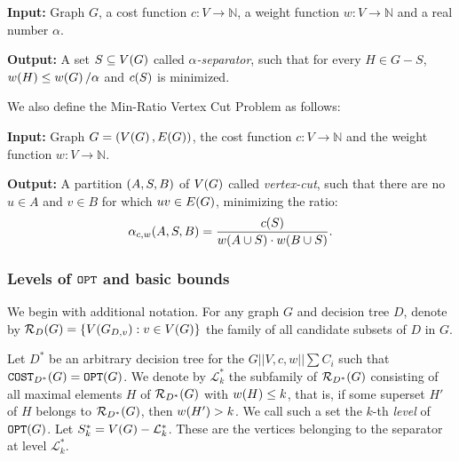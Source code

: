 \begin{tcolorbox}[colback=white, title=Weighted $\alpha$-Separator Problem, fonttitle=\bfseries, breakable]
\textbf{Input:} Graph $G$, a cost function $c:V\to \mathbb{N}$, a weight function $w:V\to \mathbb{N}$ and a real number $\alpha$.

\textbf{Output:} A set $S\subseteq V\mathopen{}\left( G \right)$ called \textit{$\alpha$-separator}, such that for every $H\in G-S$, $w\mathopen{}\left( H \right)\leq w\mathopen{}\left( G \right)/\alpha$ and $c\mathopen{}\left( S \right)$ is minimized.
\end{tcolorbox}
We also define the Min-Ratio Vertex Cut Problem as follows:

\begin{tcolorbox}[colback=white, title= Min-Ratio Vertex Cut Problem, fonttitle=\bfseries, breakable]
\textbf{Input:} Graph $G=\mathopen{}\left( V\mathopen{}\left( G \right), E\mathopen{}\left( G \right) \right)$, the cost function $c:V\to \mathbb{N}$ and the weight function $w:V\to \mathbb{N}$.

\textbf{Output:} A partition $\mathopen{}\left( A,S,B \right)$ of $V\mathopen{}\left( G \right)$ called \textit{vertex-cut}, such that there are no $u\in A$ and $v\in B$ for which $uv\in E\mathopen{}\left( G \right)$, minimizing the ratio:
$$
\alpha_{c,w}\mathopen{}\left( A,S,B \right)=\frac{c\mathopen{}\left( S \right)}{w\mathopen{}\left( A\cup S \right)\cdot w\mathopen{}\left( B\cup S \right)}.
$$
\end{tcolorbox}
\subsubsection{Levels of $\texttt{OPT}$ and basic bounds}\label{levelsOfOptAndBasicBounds}

We begin with additional notation. 
For any graph $G$ and decision tree $D$, denote by 
$\mathcal{R}_D\mathopen{}\left( G \right) = \mathopen{}\left\{ V\mathopen{}\left( G_{D,v} \right) : v \in V\mathopen{}\left( G \right) \right\}$ 
the family of all candidate subsets of $D$ in $G$. 

Let $D^*$ be an arbitrary decision tree for the $G||V,c,w||\sum C_i$ such that 
$\texttt{COST}_{D^*}\mathopen{}\left( G \right) = \texttt{OPT}\mathopen{}\left( G \right)$. 
We denote by $\mathcal{L}_{k}^*$ the subfamily of $\mathcal{R}_{D^*}\mathopen{}\left( G \right)$ 
consisting of all maximal elements $H$ of $\mathcal{R}_{D^*}\mathopen{}\left( G \right)$ with $w\mathopen{}\left( H \right) \leq k$, 
that is, if some superset $H'$ of $H$ belongs to $\mathcal{R}_{D^*}\mathopen{}\left( G \right)$, 
then $w\mathopen{}\left( H' \right) > k$. 
We call such a set the $k$-th \textit{level} of $\texttt{OPT}\mathopen{}\left( G \right)$. 
Let $S_{k}^* = V\mathopen{}\left( G \right) - \mathcal{L}_{k}^*$. 
These are the vertices belonging to the separator at level $\mathcal{L}_{k}^*$. 

